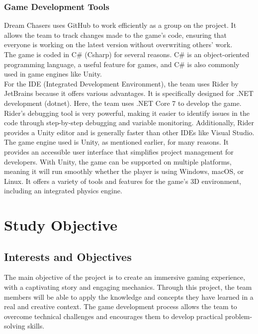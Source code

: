 \documentclass{article}
\begin{document}
\subsubsection{Game Development Tools}\hfill

Dream Chasers uses GitHub to work efficiently as a group on the project. It allows the team to track changes made to the game's code, ensuring that everyone is working on the latest version without overwriting others' work.\\

The game is coded in C\# (Csharp) for several reasons. C\# is an object-oriented programming language, a useful feature for games, and C\# is also commonly used in game engines like Unity.\\

For the IDE (Integrated Development Environment), the team uses Rider by JetBrains because it offers various advantages. It is specifically designed for .NET development (dotnet). Here, the team uses .NET Core 7 to develop the game. Rider's debugging tool is very powerful, making it easier to identify issues in the code through step-by-step debugging and variable monitoring. Additionally, Rider provides a Unity editor and is generally faster than other IDEs like Visual Studio.\\

The game engine used is Unity, as mentioned earlier, for many reasons. It provides an accessible user interface that simplifies project management for developers. With Unity, the game can be supported on multiple platforms, meaning it will run smoothly whether the player is using Windows, macOS, or Linux. It offers a variety of tools and features for the game's 3D environment, including an integrated physics engine.
















\newpage
\section{Study Objective}
\subsection{Interests and Objectives}\hfill

The main objective of the project is to create an immersive gaming experience, with a captivating story and engaging mechanics. Through this project, the team members will be able to apply the knowledge and concepts they have learned in a real and creative context. The game development process allows the team to overcome technical challenges and encourages them to develop practical problem-solving skills.
\end{document}
